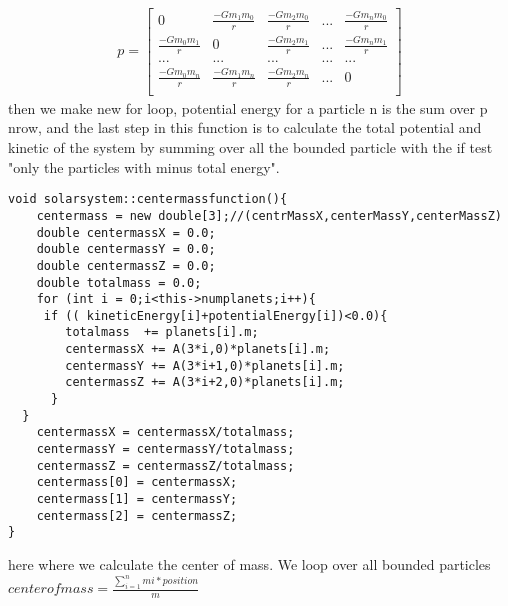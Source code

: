 \documentclass[10pt,a4paper]{article}
\begin{document}
\begin{align}
p=
\begin{bmatrix}
0 & \frac{-Gm_1m_0}{r} & \frac{-Gm_2m_0}{r} & ... & \frac{-Gm_nm_0}{r}  \\
\frac{-Gm_0m_1}{r} & 0 & \frac{-Gm_2m_1}{r} & ... & \frac{-Gm_nm_1}{r}  \\
... & ... & ... & ... & ... \\
\frac{-Gm_0m_n}{r} & \frac{-Gm_1m_n}{r} & \frac{-Gm_2m_n}{r} & ... & 0  \\
\end{bmatrix}
\end{align} 
then we make new for loop, potential energy for a particle n is the sum over p nrow, and the last step in this function is to calculate the total potential and kinetic of the system by summing over all the bounded particle with the if test "only the particles with minus total energy". 
\begin{lstlisting} 
void solarsystem::centermassfunction(){
    centermass = new double[3];//(centrMassX,centerMassY,centerMassZ)
    double centermassX = 0.0;
    double centermassY = 0.0;
    double centermassZ = 0.0;
    double totalmass = 0.0;
    for (int i = 0;i<this->numplanets;i++){
     if (( kineticEnergy[i]+potentialEnergy[i])<0.0){
        totalmass  += planets[i].m;
        centermassX += A(3*i,0)*planets[i].m;
        centermassY += A(3*i+1,0)*planets[i].m;
        centermassZ += A(3*i+2,0)*planets[i].m;
      }
  }
    centermassX = centermassX/totalmass;
    centermassY = centermassY/totalmass;
    centermassZ = centermassZ/totalmass;
    centermass[0] = centermassX;
    centermass[1] = centermassY;
    centermass[2] = centermassZ;
}
\end{lstlisting}
 
here where we calculate the center of mass. We loop over all bounded particles $center of mass = \frac{\sum\limits_{i=1}^n mi*position}{m} $  
\end{document}
